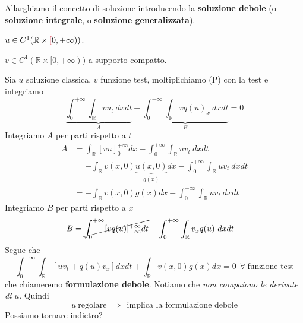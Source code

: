 \documentclass[10pt,a4paper,twoside,openright]{book}
\begin{document}
Allarghiamo il concetto di soluzione introducendo la \textbf{soluzione debole} (o \textbf{soluzione integrale}, o \textbf{soluzione generalizzata}).
\begin{definition}
 $u\in C^{1}(\mathbb{R} \times \textcolor[rgb]{0.82,0.01,0.11}{[} 0,+\infty ))$.
\end{definition}
\begin{definition}
 $v\in C^{1}(\mathbb{R} \times [ 0,+\infty ))$ a supporto compatto.
\end{definition}
Sia $u$ soluzione classica, $v$ funzione test, moltiplichiamo (P) con la test e integriamo
\begin{equation*}
	\underbrace{\int ^{+\infty }_{0}\int _{\mathbb{R}} vu_{t} \ dxdt}_{A} +\underbrace{\int ^{+\infty }_{0}\int _{\mathbb{R}} vq( u)_{x} \ dxdt}_{B} =0
\end{equation*}
Integriamo $A$ per parti rispetto a $t$
\begin{align*}
	A & =\int _{\mathbb{R}}[ vu]^{+\infty }_{0} dx-\int ^{+\infty }_{0}\int _{\mathbb{R}} uv_{t} \ dxdt                  \\
	  & =-\int _{\mathbb{R}} v( x,0)\underbrace{u( x,0)}_{g( x)} dx-\int ^{+\infty }_{0}\int _{\mathbb{R}} uv_{t} \ dxdt \\
	  & =-\int _{\mathbb{R}} v( x,0) g( x) dx-\int ^{+\infty }_{0}\int _{\mathbb{R}} uv_{t} \ dxdt                       
\end{align*}
Integriamo $B$ per parti rispetto a $x$
\begin{align*}
	B & =\cancel{\int ^{+\infty }_{0}[ vq( u)]^{+\infty }_{-\infty } dt} -\int ^{+\infty }_{0}\int _{\mathbb{R}} v_{x} q( u) \ dxdt 
\end{align*}
Segue che
\begin{equation}
	\int ^{+\infty }_{0}\int _{\mathbb{R}}[ uv_{t} +q( u) v_{x}] dxdt+\int _{\mathbb{R}} v( x,0) g( x) dx=0\ \ \forall \ \text{funzione test}
\label{eq:formulazione-debole}
\end{equation}
che chiameremo \textbf{formulazione debole}. Notiamo che \textit{non compaiono le derivate di} $u$. Quindi
\begin{equation*}
	u\ \text{regolare} \ \ \Rightarrow \ \ \text{implica la formulazione debole}
\end{equation*}
Possiamo tornare indietro?
				
\end{document}
